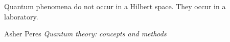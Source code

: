 

\label{chap:rules}

\begin{refsection}

\begin{quoting}
   \openquote 
   Quantum phenomena do not occur in a Hilbert space. They occur in a
   laboratory.~\closequote
   \begin{flushright}
       Asher Peres 
       \emph{Quantum theory: concepts and methods}
    \end{flushright}
\end{quoting}



\printbibliography[heading=subbibliography]
\end{refsection}

